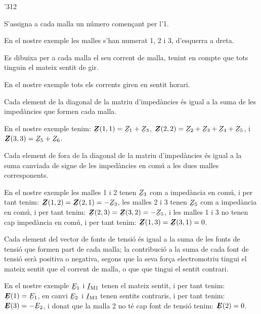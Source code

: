 \begin{dingautolist}{'312}
   \item S'assigna a cada malla un número començant per l'1.

          En el nostre exemple les malles s'han numerat 1, 2 i 3, d'esquerra a dreta.
   \item Es dibuixa per a  cada malla el seu corrent de malla, tenint en compte que tots tinguin el mateix sentit de gir.

       En el nostre exemple tots els corrents giren en sentit horari.
   \item Cada element de la diagonal de la matriu d'impedàncies és igual a la suma de les impedàncies que formen cada malla.

       En el nostre exemple tenim: $\mcmplx{Z}(1,1)=\cmplx{Z}_1 + \cmplx{Z}_3$, $\mcmplx{Z}(2,2)=\cmplx{Z}_2 + \cmplx{Z}_3+ \cmplx{Z}_4+ \cmplx{Z}_5$, i $\mcmplx{Z}(3,3)=\cmplx{Z}_5 + \cmplx{Z}_6$.
   \item Cada element de fora de la diagonal de la matriu d'impedàncies és igual a la suma canviada de signe de les impedàncies en comú a les dues malles corresponents.

        En el nostre exemple les malles 1 i 2 tenen $\cmplx{Z}_3$ com a impedància en comú, i per tant tenim: $\mcmplx{Z}(1,2)=\mcmplx{Z}(2,1)= -\cmplx{Z}_3$, les malles 2 i 3 tenen $\cmplx{Z}_5$ com a impedància en comú, i per tant  tenim: $\mcmplx{Z}(2,3)=\mcmplx{Z}(3,2)= -\cmplx{Z}_5$, i les malles 1 i 3 no tenen cap impedància en comú, i per tant  tenim: $\mcmplx{Z}(1,3)=\mcmplx{Z}(3,1)= 0$.
    \item Cada element del vector de fonts de tensió és igual a la suma de les fonts de tensió que formen part de cada malla; la contribució a la suma de cada font de tensió serà positiva o negativa, segons que la seva força electromotriu tingui el mateix sentit que el corrent de malla, o que que tingui el sentit contrari.

         En el nostre exemple $\cmplx{E}_1$ i $\cmplx{I}\ped{M1}$ tenen el mateix sentit, i per tant tenim:   $\mcmplx{E}(1) = \cmplx{E}_1$, en canvi $\cmplx{E}_2$ i $\cmplx{I}\ped{M3}$ tenen   sentits contraris, i per tant   tenim:   $\mcmplx{E}(3) = -\cmplx{E}_2$, i donat que la malla 2 no té cap font de tensió  tenim:   $\mcmplx{E}(2) = 0$.
\end{dingautolist}

